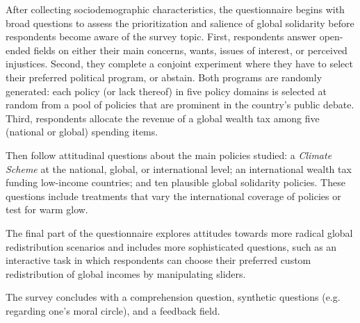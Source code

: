 \documentclass[12pt,english]{article}
\begin{document}
\begin{bibunit}
After collecting sociodemographic characteristics, the questionnaire begins with broad questions to assess the prioritization and salience of global solidarity before respondents become aware of the survey topic. First, respondents answer open-ended fields on either their main concerns, wants, issues of interest, or perceived injustices. Second, they complete a conjoint experiment where they have to select their preferred political program, or abstain. Both programs are randomly generated: each policy (or lack thereof) in five policy domains is selected at random from a pool of policies that are prominent in the country's public debate. Third, respondents allocate the revenue of a global wealth tax among five (national or global) spending items. 

Then follow attitudinal questions about the main policies studied: a \textit{Climate Scheme} at the national, global, or international level; an international wealth tax funding low-income countries; and ten plausible global solidarity policies. These questions include treatments that vary the international coverage of policies or test for warm glow. 

The final part of the questionnaire explores attitudes towards more radical global redistribution scenarios and includes more sophisticated questions, such as an interactive task in which respondents can choose their preferred custom redistribution of global incomes by manipulating sliders. 

The survey concludes with a comprehension question, synthetic questions (e.g. regarding one's moral circle), and a feedback field.




\end{bibunit}
\end{document}

